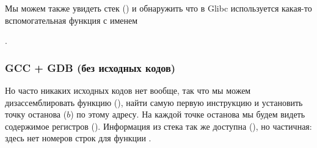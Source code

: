 Мы можем также увидеть стек () и обнаружить что в Glibc используется какая-то вспомогательная функция с именем
 
.



\subsubsection{GCC + GDB (без исходных кодов)}

Но часто никаких исходных кодов нет вообще, так что мы можем дизассемблировать функцию \comp (), 
найти самую первую инструкцию \CMP и установить точку останова ($b$) по этому адресу.
На каждой точке останова мы будем видеть содержимое регистров ().
Информация из стека так же доступна (), 
но частичная: здесь нет номеров строк для функции \comp.



